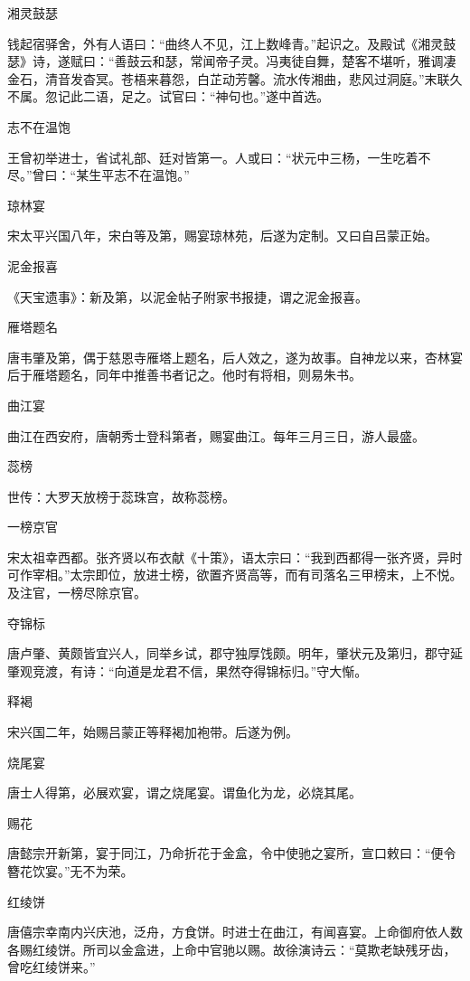 \documentclass[a4paper,12pt,UTF8,twoside]{ctexbook}
\begin{document}
    湘灵鼓瑟
    
    钱起宿驿舍，外有人语曰：“曲终人不见，江上数峰青。”起识之。及殿试《湘灵鼓瑟》诗，遂赋曰：“善鼓云和瑟，常闻帝子灵。冯夷徒自舞，楚客不堪听，雅调凄金石，清音发杳冥。苍梧来暮怨，白芷动芳馨。流水传湘曲，悲风过洞庭。”末联久不属。忽记此二语，足之。试官曰：“神句也。”遂中首选。
    
    志不在温饱
    
    王曾初举进士，省试礼部、廷对皆第一。人或曰：“状元中三杨，一生吃着不尽。”曾曰：“某生平志不在温饱。”
    
    琼林宴
    
    宋太平兴国八年，宋白等及第，赐宴琼林苑，后遂为定制。又曰自吕蒙正始。
    
    泥金报喜
    
    《天宝遗事》：新及第，以泥金帖子附家书报捷，谓之泥金报喜。
    
    雁塔题名
    
    唐韦肇及第，偶于慈恩寺雁塔上题名，后人效之，遂为故事。自神龙以来，杏林宴后于雁塔题名，同年中推善书者记之。他时有将相，则易朱书。
    
    曲江宴
    
    曲江在西安府，唐朝秀士登科第者，赐宴曲江。每年三月三日，游人最盛。
    
    蕊榜
    
    世传：大罗天放榜于蕊珠宫，故称蕊榜。
    
    一榜京官
    
    宋太祖幸西都。张齐贤以布衣献《十策》，语太宗曰：“我到西都得一张齐贤，异时可作宰相。”太宗即位，放进士榜，欲置齐贤高等，而有司落名三甲榜末，上不悦。及注官，一榜尽除京官。
    
    夺锦标
    
    唐卢肇、黄颇皆宜兴人，同举乡试，郡守独厚饯颇。明年，肇状元及第归，郡守延肇观竞渡，有诗：“向道是龙君不信，果然夺得锦标归。”守大惭。
    
    释褐
    
    宋兴国二年，始赐吕蒙正等释褐加袍带。后遂为例。
    
    烧尾宴
    
    唐士人得第，必展欢宴，谓之烧尾宴。谓鱼化为龙，必烧其尾。
    
    赐花
    
    唐懿宗开新第，宴于同江，乃命折花于金盒，令中使驰之宴所，宣口敕曰：“便令簪花饮宴。”无不为荣。
    
    红绫饼
    
    唐僖宗幸南内兴庆池，泛舟，方食饼。时进士在曲江，有闻喜宴。上命御府依人数各赐红绫饼。所司以金盒进，上命中官驰以赐。故徐演诗云：“莫欺老缺残牙齿，曾吃红绫饼来。”
    
\end{document}
